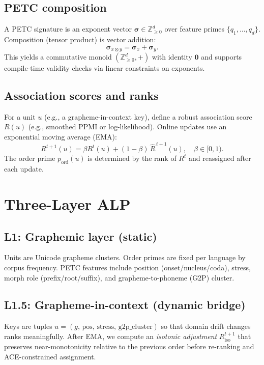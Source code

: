 \documentclass[11pt]{article}
\newcommand{\Z}{\mathbb{Z}}
\newcommand{\sig}{\boldsymbol{\sigma}}
\begin{document}
\subsection{PETC composition}
A PETC signature is an exponent vector $\sig\in\Z^{d}_{\ge 0}$ over feature primes $\{q_1,\dots,q_d\}$. Composition (tensor product) is vector addition:
\begin{equation}
  \sig_{x\otimes y} = \sig_x + \sig_y. \label{eq:petc-add}
\end{equation}
This yields a commutative monoid $(\Z^{d}_{\ge 0},+)$ with identity $\mathbf{0}$ and supports compile-time validity checks via linear constraints on exponents.

\subsection{Association scores and ranks}
For a unit $u$ (e.g., a grapheme-in-context key), define a robust association score $R(u)$ (e.g., smoothed PPMI or log-likelihood). Online updates use an exponential moving average (EMA):
\begin{equation}
  R^{t+1}(u) = \beta R^{t}(u) + (1-\beta)\,\widehat{R}^{\,t+1}(u), \quad \beta\in[0,1). \label{eq:ema}
\end{equation}
The order prime $p_{\text{ord}}(u)$ is determined by the rank of $R^t$ and reassigned after each update.

\section{Three-Layer ALP}
\subsection{L1: Graphemic layer (static)}
Units are Unicode grapheme clusters. Order primes are fixed per language by corpus frequency. PETC features include position (onset/nucleus/coda), stress, morph role (prefix/root/suffix), and grapheme-to-phoneme (G2P) cluster.

\subsection{L1.5: Grapheme-in-context (dynamic bridge)}
Keys are tuples $u=(g,\,\text{pos},\,\text{stress},\,\text{g2p\_cluster})$ so that domain drift changes ranks meaningfully. After EMA, we compute an \emph{isotonic adjustment} $R^{t+1}_{\text{iso}}$ that preserves near-monotonicity relative to the previous order before re-ranking and ACE-constrained assignment.
\end{document}
